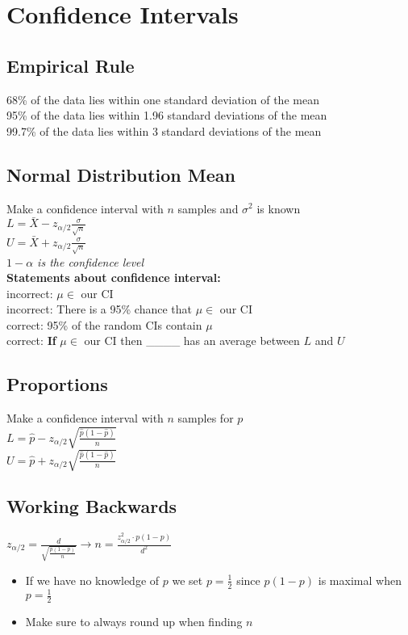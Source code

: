 \documentclass{article}
\begin{document}
\section{Confidence Intervals}
\label{sec:ci}
\subsection{Empirical Rule}
68\% of the data lies within one standard deviation of the mean\\
95\% of the data lies within 1.96 standard deviations of the mean\\
99.7\% of the data lies within 3 standard deviations of the mean
\subsection{Normal Distribution Mean}
Make a confidence interval with $n$ samples and $\sigma^2$ is known\\
$L=\bar X-z_{\alpha/2}\frac{\sigma}{\sqrt{n}}$\\
$U=\bar X+z_{\alpha/2}\frac{\sigma}{\sqrt{n}}$\\
\textit{$1-\alpha$ is the confidence level}\\
\textbf{Statements about confidence interval:}\\
incorrect: $\mu\in \text{ our CI}$\\
incorrect: There is a 95\% chance that $\mu\in\text{ our CI}$\\
correct: 95\% of the random CIs contain $\mu$\\
correct: \textbf{If} $\mu\in \text{ our CI}$ then \_\_\_\_ has an average between $L$ and $U$
\newpage
\subsection{Proportions}
Make a confidence interval with $n$ samples for $p$\\
$L=\hat p-z_{\alpha/2}\sqrt{\frac{\hat p(1-\hat p)}{n}}$\\
$U=\hat p+z_{\alpha/2}\sqrt{\frac{\hat p(1-\hat p)}{n}}$
\subsection{Working Backwards}
$z_{\alpha/2}=\frac{d}{\sqrt{\frac{p(1-p)}{n}}} \rightarrow n=\frac{z_{\alpha/2}^2\cdot p(1-p)}{d^2}$\\
\begin{itemize}
    \item If we have no knowledge of $p$ we set $p=\frac{1}{2}$ since $p(1-p)$ is maximal when $p=\frac{1}{2}$
    \item Make sure to always round up when finding $n$
\end{itemize}
\end{document}
